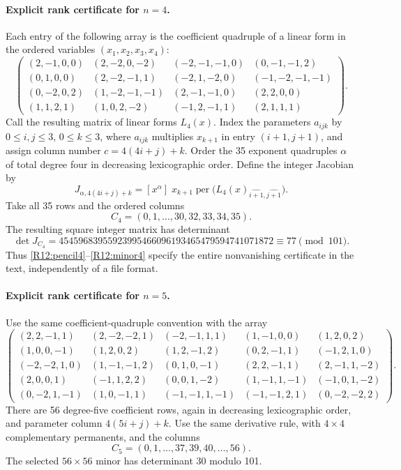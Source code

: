 \documentclass[11pt,a4paper]{article}
\theoremstyle{definition}\newtheorem{definition}{Definition}
\begin{document}
\paragraph{Explicit rank certificate for $n=4$.}
Each entry of the following array is the coefficient quadruple of
a linear form in the ordered variables $(x_1,x_2,x_3,x_4)$:
\begin{equation}\label{R12:pencil4}
\begin{pmatrix}
(2,-1,0,0)&(2,-2,0,-2)&(-2,-1,-1,0)&(0,-1,-1,2)\\
(0,1,0,0)&(2,-2,-1,1)&(-2,1,-2,0)&(-1,-2,-1,-1)\\
(0,-2,0,2)&(1,-2,-1,-1)&(2,-1,-1,0)&(2,2,0,0)\\
(1,1,2,1)&(1,0,2,-2)&(-1,2,-1,1)&(2,1,1,1)
\end{pmatrix}.
\end{equation}
Call the resulting matrix of linear forms $L_4(x)$. Index the
parameters $a_{ijk}$ by $0\leq i,j\leq3$, $0\leq k\leq3$,
where $a_{ijk}$ multiplies $x_{k+1}$ in entry $(i+1,j+1)$,
and assign column number $c=4(4i+j)+k$.
Order the 35 exponent quadruples $\alpha$ of total degree four in
decreasing lexicographic order. Define the integer Jacobian by
\begin{equation}\label{R12:derivative}
 J_{\alpha,4(4i+j)+k}
 =[x^\alpha]\;x_{k+1}
 \operatorname{per}\bigl(L_4(x)_{\widehat{i+1},\widehat{j+1}}\bigr).
\end{equation}
Take all 35 rows and the ordered columns
\[
 C_4=(0,1,\ldots,30,32,33,34,35).
\]
The resulting square integer matrix has determinant
\begin{equation}\label{R12:minor4}
 \det J_{C_4}
 =45459683955923995466096193465479594741071872
 \equiv77\pmod{101}.
\end{equation}
Thus \eqref{R12:pencil4}--\eqref{R12:minor4} specify the entire
nonvanishing certificate in the text, independently of a file format.

\paragraph{Explicit rank certificate for $n=5$.}
Use the same coefficient-quadruple convention with the array
\begin{equation}\label{R12:pencil5}
\begin{pmatrix}
(2,2,-1,1)&(2,-2,-2,1)&(-2,-1,1,1)&(1,-1,0,0)&(1,2,0,2)\\
(1,0,0,-1)&(1,2,0,2)&(1,2,-1,2)&(0,2,-1,1)&(-1,2,1,0)\\
(-2,-2,1,0)&(1,-1,-1,2)&(0,1,0,-1)&(2,2,-1,1)&(2,-1,1,-2)\\
(2,0,0,1)&(-1,1,2,2)&(0,0,1,-2)&(1,-1,1,-1)&(-1,0,1,-2)\\
(0,-2,1,-1)&(1,0,-1,1)&(-1,-1,1,-1)&(-1,-1,2,1)&(0,-2,-2,2)
\end{pmatrix}.
\end{equation}
There are 56 degree-five coefficient rows, again in decreasing
lexicographic order, and parameter column $4(5i+j)+k$.
Use the same derivative rule, with $4\times4$ complementary
permanents, and the columns
\[
 C_5=(0,1,\ldots,37,39,40,\ldots,56).
\]
The selected $56\times56$ minor has determinant $30$ modulo 101.
\end{document}
